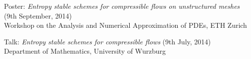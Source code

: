 \documentclass[margin]{res}
\begin{document}
\begin{resume}
              Poster: {\it Entropy stable schemes for compressible flows on unstructured meshes} (9th September, 2014)\\
               Workshop on the Analysis and Numerical Approximation of PDEs, ETH Zurich
              
              Talk: {\it Entropy stable schemes for compressible flows} (9th July, 2014)\\
               Department of Mathematics, University of W$\ddot{\text{u}}$rzburg             

%             
%              
%               
%               
%               
%
%               
%   
%   
%               

\end{resume}
\end{document}
